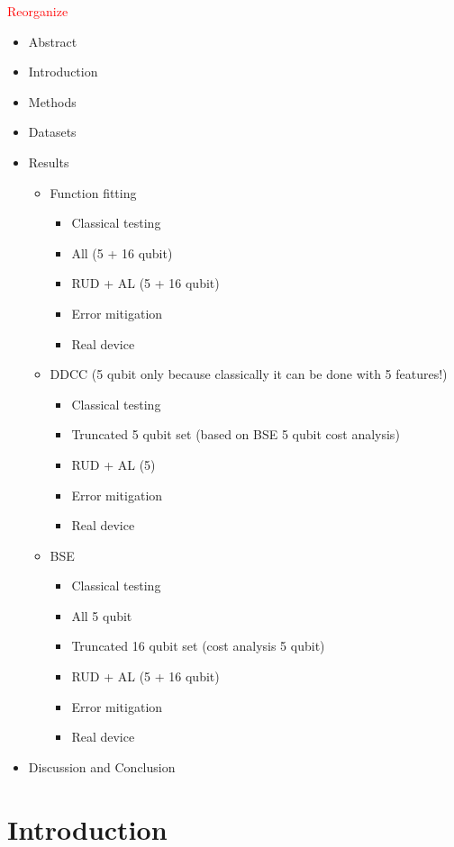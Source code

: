 \documentclass[journal=jacsat,manuscript=article]{achemso}
\begin{document}
\newpage
\textcolor{red}{Reorganize}
\begin{itemize}
	\item Abstract
	\item Introduction
	\item Methods
	\item Datasets
	\item Results
	\begin{itemize}
		\item Function fitting 
		\begin{itemize}
			\item Classical testing
			\item All (5 + 16 qubit)
			\item RUD + AL (5 + 16 qubit)
			\item Error mitigation
			\item Real device
		\end{itemize}
		\item DDCC (5 qubit only because classically it can be done with 5 features!)
		\begin{itemize}
			\item Classical testing
			\item Truncated  5 qubit set (based on BSE 5 qubit cost analysis)
			\item RUD + AL (5)
			\item Error mitigation
			\item Real device
		\end{itemize}
		\item BSE
		\begin{itemize}
			\item Classical testing
			\item All 5 qubit
			\item Truncated 16 qubit set (cost analysis 5 qubit)
			\item RUD + AL (5 + 16 qubit)
			\item Error mitigation
			\item Real device
		\end{itemize}				
	\end{itemize}
	\item Discussion and Conclusion
\end{itemize}

\newpage
\section{Introduction}
\cite{prasad_applications_2024}
\cite{suzuki_predicting_2020}
\cite{mitarai_quantum_2018}
\cite{sim_expressibility_2019}
\cite{hatakeyama-sato_quantum_2023}
\cite{krenn_artificial_2023}
\cite{benedetti_parameterized_2019}
\cite{biamonte_quantum_2017}
\end{document}
